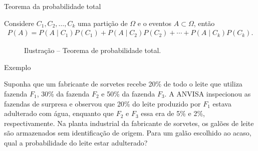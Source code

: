 \documentclass[9pt]{beamer}
\begin{document}
\begin{frame}{Teorema da probabilidade total}

	Considere $C_1, C_2, \dots, C_k$ uma partição de $\Omega$ e o eventos $A \subset \Omega$, então
		\begin{align*}
		P(A) = P(A \mid C_1) P(C_1) + P(A \mid C_2) P(C_2) + \cdots + P(A \mid C_k) P(C_k).
		\end{align*}


		\begin{figure}[htbp]
		\caption{Ilustração -- Teorema de probabilidade total.}
	 \end{figure}

\end{frame}


\begin{frame}{Exemplo}


Suponha que um fabricante de sorvetes recebe 20\% de todo o leite que utiliza fazenda $F_1$, 30\% da fazenda $F_2$ e 50\% da fazenda $F_3$. 
A ANVISA inspecionou as fazendas de surpresa e observou que 20\% do leite produzido por $F_1$ estava adulterado com água, enquanto que $F_2$ e $F_3$ essa era de 5\% e 2\%, respectivamente. 
Na planta industrial da fabricante de sorvetes, os galões de leite são armazenados sem identificação de origem. Para um galão escolhido ao acaso, qual a probabilidade do leite estar adulterado?

\end{frame}
\end{document}

